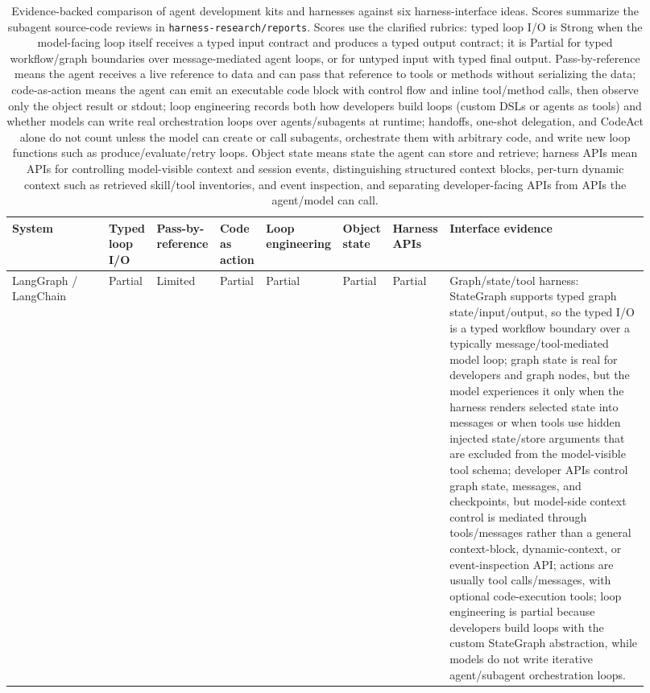 \documentclass[11pt, logo, onecolumn, copyright, colorlinks=true, allcolors=blue]{nvidiatechreport}
\begin{document}
\begin{landscape}
\begin{table}[p]
\centering
\caption{Evidence-backed comparison of agent development kits and harnesses
against six harness-interface ideas.  Scores summarize the subagent source-code
reviews in \texttt{harness-research/reports}.  Scores use the clarified rubrics: typed loop I/O is Strong when the model-facing
loop itself receives a typed input contract and produces a typed output contract;
it is Partial for typed workflow/graph boundaries over message-mediated agent
loops, or for untyped input with typed final output.  Pass-by-reference means the agent receives a live reference to data and can
pass that reference to tools or methods without serializing the data; code-as-action means the agent can emit an executable code block with control
flow and inline tool/method calls, then observe only the object result or stdout;
loop engineering records both how developers build loops (custom DSLs or agents
as tools) and whether models can write real orchestration loops over
agents/subagents at runtime; handoffs, one-shot delegation, and CodeAct alone do
not count unless the model can create or call subagents, orchestrate them with
arbitrary code, and write new loop functions such as produce/evaluate/retry
loops.  Object state means state the agent can store and retrieve; harness APIs mean APIs for controlling model-visible context and session
events, distinguishing structured context blocks, per-turn dynamic context such
as retrieved skill/tool inventories, and event inspection, and separating
developer-facing APIs from APIs the agent/model can call.}
\label{tab:harness-idea-comparison}
\begin{adjustbox}{max width=\linewidth}
\scriptsize
\begin{tabular}{p{0.15\linewidth}p{0.075\linewidth}p{0.085\linewidth}p{0.075\linewidth}p{0.075\linewidth}p{0.075\linewidth}p{0.075\linewidth}p{0.31\linewidth}}
\toprule
\textbf{System} & \textbf{Typed loop I/O} & \textbf{Pass-by-reference} & \textbf{Code as action} & \textbf{Loop engineering} & \textbf{Object state} & \textbf{Harness APIs} & \textbf{Interface evidence} \\
\midrule
LangGraph / LangChain & Partial & Limited & Partial & Partial & Partial & Partial & Graph/state/tool harness: StateGraph supports typed graph state/input/output, so the typed I/O is a typed workflow boundary over a typically message/tool-mediated model loop; graph state is real for developers and graph nodes, but the model experiences it only when the harness renders selected state into messages or when tools use hidden injected state/store arguments that are excluded from the model-visible tool schema; developer APIs control graph state, messages, and checkpoints, but model-side context control is mediated through tools/messages rather than a general context-block, dynamic-context, or event-inspection API; actions are usually tool calls/messages, with optional code-execution tools; loop engineering is partial because developers build loops with the custom StateGraph abstraction, while models do not write iterative agent/subagent orchestration loops. \\

\end{tabular}
\end{adjustbox}
\end{table}
\end{landscape}
\end{document}
